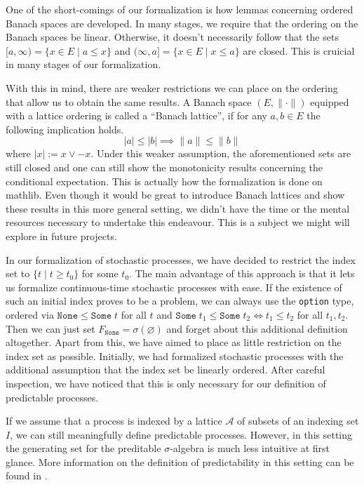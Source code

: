 One of the short-comings of our formalization is how lemmas concerning ordered Banach spaces are developed. In many stages, we require that the ordering on the Banach spaces be linear. Otherwise, it doesn't necessarily follow that the sets $[a,\infty) = \{x \in E\;\vert\; a \le x\}$ and $(\infty, a] = \{x \in E\;\vert\; x \le a\}$ are closed. This is cruicial in many stages of our formalization. 

With this in mind, there are weaker restrictions we can place on the ordering that allow us to obtain the same results. A Banach space $(E, \lVert \cdot \rVert)$ equipped with a lattice ordering is called a ``Banach lattice'', if for any $a, b\in E$ the following implication holds.
\[
	\lvert a \rvert \le \lvert b \rvert \implies \lVert a \rVert \le \lVert b \rVert
\]
where $\lvert x \rvert := x \vee -x$. Under this weaker assumption, the aforementioned sets are still closed and one can still show the monotonicity results concerning the conditional expectation. This is actually how the formalization is done on \textsf{mathlib}. Even though it would be great to introduce Banach lattices and show these results in this more general setting, we didn't have the time or the mental resources necessary to undertake this endeavour. This is a subject we might will explore in future projects.

In our formalization of stochastic processes, we have decided to restrict the index set to $\{t \; \vert\; t \ge t_0\}$ for some $t_0$. The main advantage of this approach is that it lets us formalize continuous-time stochastic processes with ease. If the existence of such an initial index proves to be a problem, we can always use the \texttt{option} type, ordered via $\texttt{None} \le \texttt{Some} \; t$ for all $t$ and $\texttt{Some} \; t_1 \le \texttt{Some} \; t_2 \iff t_1 \le t_2$ for all $t_1, t_2$. Then we can just set $F_{\texttt{None}} = \sigma(\varnothing)$ and forget about this additional definition altogether. Apart from this, we have aimed to place as little restriction on the index set as possible. Initially, we had formalized stochastic processes with the additional assumption that the index set be linearly ordered. After careful inspection, we have noticed that this is only necessary for our definition of predictable processes.

\begin{remark} 
	If we assume that a process is indexed by a lattice $\mathcal{A}$ of subsets of an indexing set $I$, we can still meaningfully define predictable processes. However, in this setting the generating set for the preditable $\sigma$-algebra is much less intuitive at first glance. More information on the definition of predictability in this setting can be found in \cite{Ivanoff1993}.
\end{remark}

